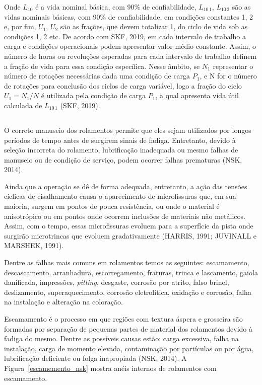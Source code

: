 \documentclass[
	12pt,				
	oneside,			
	a4paper,			
	english,			
	brazil,			
	]{abntex2ppgsi}
\begin{document}
Onde $L_{10}$ é a vida nominal básica, com 90\% de confiabilidade, $L_{10 \,1}$, $L_{10 \,2}$ são as vidas nominais básicas, com 90\% de confiabilidade, em condições constantes 1, 2 e, por fim, $U_{1}$, $U_{2}$ são as frações, que devem totalizar 1, do ciclo de vida sob as condições 1, 2 etc. De acordo com SKF, 2019, em cada intervalo de trabalho a carga e condições operacionais podem apresentar valor médio constante. Assim, o número de horas ou revoluções esperadas para cada intervalo de trabalho definem a fração de vida para essa condição específica. Nesse âmbito, se ${N_{1}}$ representar o número de rotações necessárias dada uma condição de carga ${P_{1}}$, e N for o número de rotações para conclusão dos ciclos de carga variável, logo a fração do ciclo ${U_{1} = N_{1} / N}$ é utilizada pela condição de carga ${P_{1}}$, a qual apresenta vida útil calculada de ${L_{10 \,1}}$ (SKF, 2019).

\subsection{}

O correto manuseio dos rolamentos permite que eles sejam utilizados por longos períodos de tempo antes de surgirem sinais de fadiga. Entretanto, devido à seleção incorreta do rolamento, lubrificação inadequada ou mesmo falhas de manuseio ou de condição de serviço, podem ocorrer falhas prematuras (NSK, 2014).

Ainda que a operação se dê de forma adequada, entretanto, a ação das tensões cíclicas de cisalhamento causa o aparecimento de microfissuras que, em sua maioria, surgem em pontos de pouca resistência, ou onde o material é anisotrópico  ou em pontos onde ocorrem inclusões de materiais não metálicos. Assim, com o tempo, essas microfissuras evoluem para a superfície da pista onde surgirão microtrincas que evoluem gradativamente (HARRIS, 1991; JUVINALL e MARSHEK, 1991).

Dentre as falhas mais comuns em rolamentos temos as seguintes: escamamento, descascamento, arranhadura, escorregamento, fraturas, trinca e lascamento, gaiola danificada, impressões, \textit{pitting}, desgaste, corrosão por atrito, falso brinel, deslizamento, superaquecimento, corrosão eletrolítica, oxidação e corrosão, falha na instalação e alteração na coloração.

Escamamento é o processo em que regiões com textura áspera e grosseira são formadas por separação de pequenas partes de material dos rolamentos devido à fadiga do mesmo. Dentre as possíveis causas estão: carga excessiva, falha na instalação, carga de momento elevada, contaminação por partículas ou por água, lubrificação deficiente ou folga inapropiada (NSK, 2014). A Figura~\ref{escamemento_nsk} mostra anéis internos de rolamentos com escamamento. 
\end{document}
